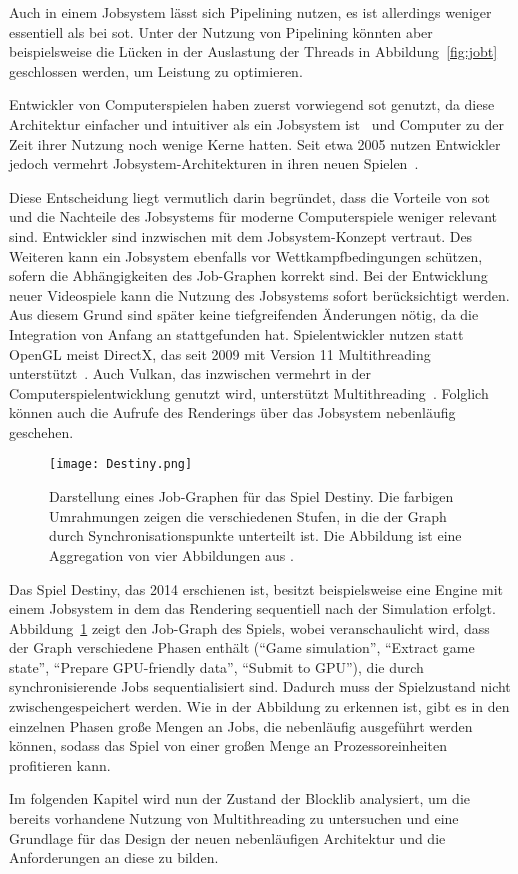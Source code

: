 Auch in einem Jobsystem lässt sich Pipelining nutzen, es ist allerdings weniger essentiell als bei \ac{sot}. Unter der Nutzung von Pipelining könnten aber beispielsweise die Lücken in der Auslastung der Threads in Abbildung~\ref{fig:jobt} geschlossen werden, um Leistung zu optimieren.

Entwickler von Computerspielen haben zuerst vorwiegend \ac{sot} genutzt, da diese Architektur einfacher und intuitiver als ein Jobsystem ist~\cite{Genova2015,Tatarchuk2014} und Computer zu der Zeit ihrer Nutzung noch wenige Kerne hatten. Seit etwa 2005 nutzen Entwickler jedoch vermehrt Jobsystem-Architekturen in ihren neuen Spielen~\cite{Davies2006,Tatarchuk2014,Genova2015,Gyrling2015,Hodgman2016}.

Diese Entscheidung liegt vermutlich darin begründet, dass die Vorteile von \ac{sot} und die Nachteile des Jobsystems für moderne Computerspiele weniger relevant sind. Entwickler sind inzwischen mit dem Jobsystem-Konzept vertraut. Des Weiteren kann ein Jobsystem ebenfalls vor Wettkampfbedingungen schützen, sofern die Abhängigkeiten des Job-Graphen korrekt sind. Bei der Entwicklung neuer Videospiele kann die Nutzung des Jobsystems sofort berücksichtigt werden. Aus diesem Grund sind später keine tiefgreifenden Änderungen nötig, da die Integration von Anfang an stattgefunden hat. Spielentwickler nutzen statt OpenGL meist DirectX, das seit 2009 mit Version 11 Multithreading unterstützt~\cite{White2018}. Auch Vulkan, das inzwischen vermehrt in der Computerspielentwicklung genutzt wird, unterstützt Multithreading~\cite{Schott2016}. Folglich können auch die Aufrufe des Renderings über das Jobsystem nebenläufig geschehen.

\begin{figure}
	\centering
	\texttt{[image: Destiny.png]}
	 \caption[Darstellung eines Job-Graphen für das Spiel Destiny.]{Darstellung eines Job-Graphen für das Spiel Destiny. Die farbigen Umrahmungen zeigen die verschiedenen Stufen, in die der Graph durch Synchronisationspunkte unterteilt ist. Die Abbildung ist eine Aggregation von vier Abbildungen aus \cite[S.~39~\psqq]{Tatarchuk2014}.}\label{fig:destiny-jobgraph}
\end{figure}

Das Spiel Destiny, das 2014 erschienen ist, besitzt beispielsweise eine Engine mit einem Jobsystem in dem das Rendering sequentiell nach der Simulation erfolgt. Abbildung~\ref{fig:destiny-jobgraph} zeigt den Job-Graph des Spiels, wobei veranschaulicht wird, dass der Graph verschiedene Phasen enthält (\enquote{Game simulation}, \enquote{Extract game state}, \enquote{Prepare GPU-friendly data}, \enquote{Submit to GPU}), die durch synchronisierende Jobs sequentialisiert sind. Dadurch muss der Spielzustand nicht zwischengespeichert werden. Wie in der Abbildung zu erkennen ist, gibt es in den einzelnen Phasen große Mengen an Jobs, die nebenläufig ausgeführt werden können, sodass das Spiel von einer großen Menge an Prozessoreinheiten profitieren kann.

Im folgenden Kapitel wird nun der Zustand der Blocklib analysiert, um die bereits vorhandene Nutzung von Multithreading zu untersuchen und eine Grundlage für das Design der neuen nebenläufigen Architektur und die Anforderungen an diese zu bilden.